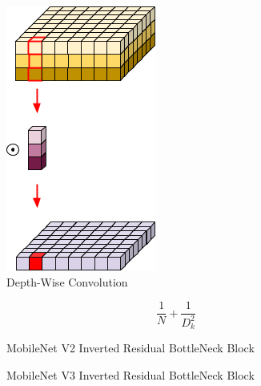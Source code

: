 \documentclass[10pt, conference]{IEEEtran}
\begin{document}
\begin{figure}[H]
    \centering
    \includegraphics[height=50ex]{./figures/depthWiseSeparableConvolution.png}
    \caption{Depth-Wise Convolution~\cite{depthWiseConvolutionImages}}%
    \label{fig:depthWiseSeparableConvolution}
\end{figure}

\begin{equation}
    \frac{1}{N} + \frac{1}{D_k^2}
    \label{eq:depthwiseSeparableConvolutionEquation}
\end{equation}


\begin{figure}[H]
    \centering
    \caption{MobileNet V2 Inverted Residual BottleNeck
    Block~\cite[p. 3]{mobile_net_v2_paper}}\label{fig:invertedResidualBottleneckBlock}
\end{figure}

\begin{figure}[H]
    \centering
    \caption{MobileNet V3 Inverted Residual BottleNeck
    Block~\cite{mobile_net_v3_paper}}\label{fig:mobilenet_v3_block}
\end{figure}
\end{document}
